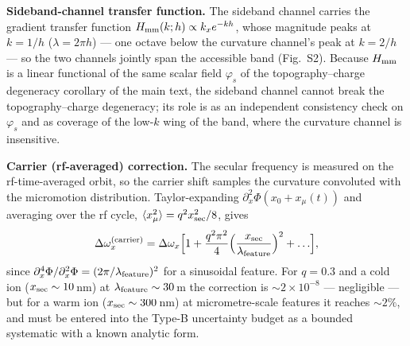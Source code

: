 \documentclass[12pt,a4paper]{article}
\begin{document}
\textbf{Sideband-channel transfer function.}
The sideband channel carries the gradient transfer function
$H_{\rm mm}(k;h)\propto k_x e^{-kh}$, whose magnitude peaks at $k=1/h$
($\lambda=2\pi h$) --- one octave below the curvature channel's peak at
$k=2/h$ --- so the two channels jointly span the accessible band
(Fig.~S2).  Because $H_{\rm mm}$ is a linear functional of
the same scalar field $\varphi_s$ of the topography--charge degeneracy
corollary of the main text, the sideband channel cannot break the
topography--charge degeneracy; its role is as an independent consistency
check on $\varphi_s$ and as coverage of the low-$k$ wing of the band,
where the curvature channel is insensitive.

\textbf{Carrier (rf-averaged) correction.}
The secular frequency is measured on the rf-time-averaged orbit, so the
carrier shift samples the curvature convoluted with the micromotion
distribution.  Taylor-expanding
$\partial_x^2\Phi(x_0+x_\mu(t))$ and averaging over the rf cycle,
$\langle x_\mu^2\rangle = q^2x_{\rm sec}^2/8$, gives
\begin{equation}
\Delta\omega_x^{\rm(carrier)} = \Delta\omega_x
    \Bigl[1 + \frac{q^2\pi^2}{4}\Bigl(\frac{x_{\rm sec}}{\lambda_{\rm
feature}}\Bigr)^{2} + \ldots\Bigr],
\end{equation}
since $\partial_x^4\Phi/\partial_x^2\Phi = (2\pi/\lambda_{\rm feature})^2$
for a sinusoidal feature.  For $q=0.3$ and a cold ion
($x_{\rm sec}\sim10$\,nm) at $\lambda_{\rm feature}\sim30$\,\textmu m
the correction is ${\sim}2\times10^{-8}$ --- negligible --- but for a warm
ion ($x_{\rm sec}\sim300$\,nm) at micrometre-scale features it reaches
${\sim}2\%$, and must be entered into the Type-B uncertainty budget as a
bounded systematic with a known analytic form.
\end{document}
